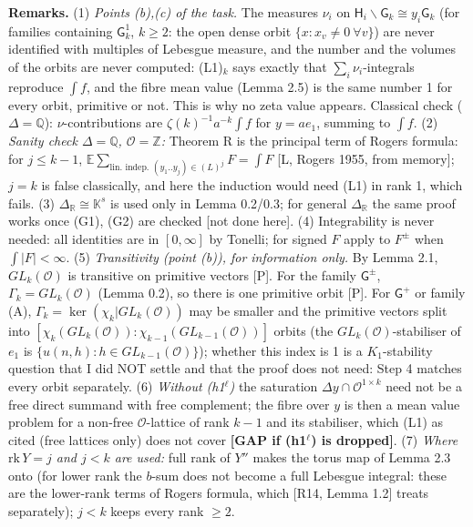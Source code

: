 \textbf{Remarks.} (1) \emph{Points (b),(c) of the task.} The measures \(\nu_i\) on \(\mathsf H_i\backslash\mathsf G_k\cong y_i\mathsf G_k\) (for families containing \(\mathsf G^1_k\), \(k\ge2\): the open dense orbit \(\{x:x_v\ne0\ \forall v\}\)) are never identified with multiples of Lebesgue measure, and the number and the volumes of the orbits are never computed: (L1)\(_k\) says exactly that \(\sum_i\nu_i\)-integrals reproduce \(\int f\), and the fibre mean value (Lemma 2.5) is the same number 1 for every orbit, primitive or not. This is why no zeta value appears. Classical check (\(\Delta=\mathbb Q\)): \(\nu\)-contributions are \(\zeta(k)^{-1}a^{-k}\int f\) for \(y=ae_1\), summing to \(\int f\). (2) \emph{Sanity check \(\Delta=\mathbb Q\), \(\mathcal O=\mathbb Z\):} Theorem R is the principal term of Rogers\textquotesingle{} formula: for \(j\le k-1\), \(\mathbb E\sum_{\text{lin. indep. }(y_1..y_j)\in(L)^j}F=\int F\) {[}L, Rogers 1955, from memory{]}; \(j=k\) is false classically, and here the induction would need (L1) in rank 1, which fails. (3) \(\Delta_{\mathbb R}\cong\mathbb K^s\) is used only in Lemma 0.2/0.3; for general \(\Delta_{\mathbb R}\) the same proof works once (G1), (G2) are checked {[}not done here{]}. (4) Integrability is never needed: all identities are in \([0,\infty]\) by Tonelli; for signed \(F\) apply to \(F^\pm\) when \(\int|F|<\infty\). (5) \emph{Transitivity (point (b)), for information only.} By Lemma 2.1, \(GL_k(\mathcal O)\) is transitive on primitive vectors {[}P{]}. For the family \(\mathsf G^\pm\), \(\Gamma_k=GL_k(\mathcal O)\) (Lemma 0.2), so there is one primitive orbit {[}P{]}. For \(\mathsf G^+\) or family (A), \(\Gamma_k=\ker(\chi_k|GL_k(\mathcal O))\) may be smaller and the primitive vectors split into \([\chi_k(GL_k(\mathcal O)):\chi_{k-1}(GL_{k-1}(\mathcal O))]\) orbits (the \(GL_k(\mathcal O)\)-stabiliser of \(e_1\) is \(\{u(n,h):h\in GL_{k-1}(\mathcal O)\}\)); whether this index is 1 is a \(K_1\)-stability question that I did NOT settle and that the proof does not need: Step 4 matches every orbit separately. (6) \emph{Without (h1\(^\ell\))} the saturation \(\Delta y\cap\mathcal O^{1\times k}\) need not be a free direct summand with free complement; the fibre over \(y\) is then a mean value problem for a non-free \(\mathcal O\)-lattice of rank \(k-1\) and its stabiliser, which (L1) as cited (free lattices only) does not cover \textbf{{[}GAP if (h1\(^\ell\)) is dropped{]}}. (7) \emph{Where \(\mathrm{rk}\,Y=j\) and \(j<k\) are used:} full rank of \(Y''\) makes the torus map of Lemma 2.3 onto (for lower rank the \(b\)-sum does not become a full Lebesgue integral: these are the lower-rank terms of Rogers\textquotesingle{} formula, which {[}R14, Lemma 1.2{]} treats separately); \(j<k\) keeps every rank \(\ge2\).

